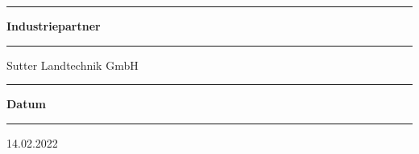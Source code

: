 \begin{titlepage}
\begin{minipage}[b]{0.84\textwidth}
	\begin{minipage}[b]{0.27\textwidth}
	\hrule\vskip 0.5cm
		\textbf{Industriepartner}\\
	\end{minipage}
	\begin{minipage}[b]{0.03\textwidth}
	\hskip 0.5cm
	\end{minipage}
	\begin{minipage}[b]{0.7\textwidth}
	\hrule\vskip 0.5cm
		Sutter Landtechnik GmbH \\
	\end{minipage}

	
	\begin{minipage}[b]{0.27\textwidth}
	\hrule\vskip 0.5cm
		\textbf{Datum}
	\end{minipage}
	\begin{minipage}[b]{0.03\textwidth}
	\hskip 0.5cm
	\end{minipage}
	\begin{minipage}[b]{0.7\textwidth}
	\hrule\vskip 0.5cm
		14.02.2022
	\end{minipage}
\end{minipage}
\vskip 0.5cm


\end{titlepage}
